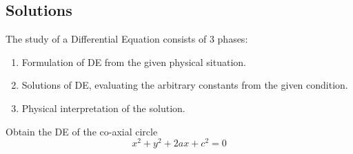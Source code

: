 \subsection{Solutions}

The study of a Differential Equation consists of $3$ phases:
\begin{enumerate}
    \item Formulation of DE from the given physical situation.
    \item Solutions of DE, evaluating the arbitrary constants from the given condition.
    \item Physical interpretation of the solution.
\end{enumerate}

\begin{example}{Obtain the DE of the co-axial circle \[
    x^2+y^2+2ax+c^2=0
\]}

    
\end{example}
